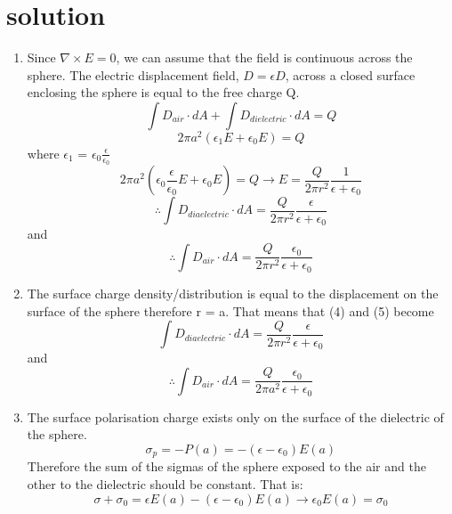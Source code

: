 \documentclass{article}
\begin{document}
\section{solution}
\begin{enumerate}
\item Since $\nabla \times E = 0$, we can assume that the field is continuous across the sphere. The electric displacement field, $D = \epsilon D$, across a closed surface enclosing the sphere is equal to the free charge Q.
\begin{equation}
\int D_{air}\cdot dA + \int D_{dielectric}\cdot dA = Q
\end{equation}
\begin{equation}
2\pi a^2(\epsilon_1 E + \epsilon_0 E) = Q
\end{equation}
where $\epsilon_1$ = $\epsilon_0 \frac{\epsilon}{\epsilon_0}$
\begin{equation}
2\pi a^2(\epsilon_0 \frac{\epsilon}{\epsilon_0}E + \epsilon_0 E) = Q \rightarrow E = \frac{Q}{2\pi r^2} \frac{1}{\epsilon + \epsilon_0}
\end{equation}
\begin{equation}
\therefore \int D_{diaelectric}\cdot dA = \frac{Q}{2\pi r^2}\frac{\epsilon}{\epsilon+\epsilon_0}
\end{equation}
and
\begin{equation}
\therefore  \int D_{air}\cdot dA = \frac{Q}{2\pi r^2}\frac{\epsilon_0}{\epsilon+\epsilon_0}
\end{equation}

\item The surface charge density/distribution is equal to the displacement on the surface of the sphere therefore r = a. That means that (4) and (5) become
\begin{equation}
\int D_{diaelectric}\cdot dA = \frac{Q}{2\pi r^2}\frac{\epsilon}{\epsilon+\epsilon_0}
\end{equation}
and
\begin{equation}
\therefore  \int D_{air}\cdot dA = \frac{Q}{2\pi a^2}\frac{\epsilon_0}{\epsilon+\epsilon_0}
\end{equation}
\item The surface polarisation charge exists only on the surface of the dielectric of the sphere. 
\begin{equation}
\sigma_p=-P(a) = -(\epsilon-\epsilon_0)E(a)
\end{equation}
Therefore the sum of the sigmas of the sphere exposed to the air and the other to the dielectric should be constant. That is:
\begin{equation}
\sigma+\sigma_0 =\epsilon E(a)-(\epsilon-\epsilon_0)E(a) \rightarrow \epsilon_0E(a) = \sigma_0
\end{equation}
\end{enumerate}
\end{document}
